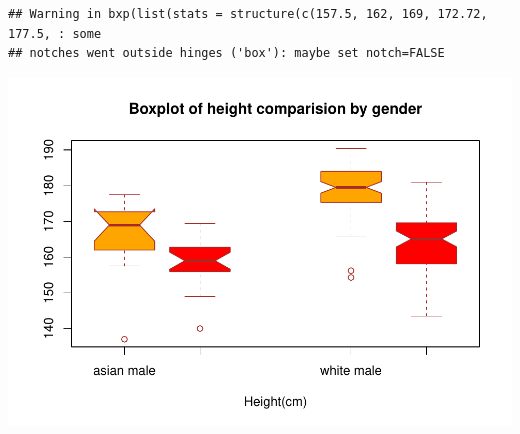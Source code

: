\documentclass[]{article}
\begin{document}
\begin{verbatim}
## Warning in bxp(list(stats = structure(c(157.5, 162, 169, 172.72, 177.5, : some
## notches went outside hinges ('box'): maybe set notch=FALSE
\end{verbatim}

\includegraphics{project-measure_files/figure-latex/box_plots-5.pdf}
\end{document}
